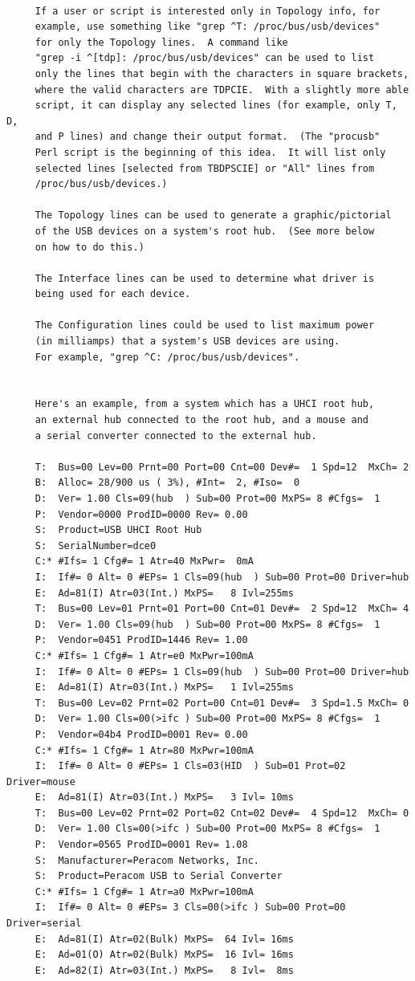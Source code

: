 {{{{{{{{{{{{{{{{{\begin{verbatim}
     
     If a user or script is interested only in Topology info, for
     example, use something like "grep ^T: /proc/bus/usb/devices"
     for only the Topology lines.  A command like
     "grep -i ^[tdp]: /proc/bus/usb/devices" can be used to list
     only the lines that begin with the characters in square brackets,
     where the valid characters are TDPCIE.  With a slightly more able
     script, it can display any selected lines (for example, only T, D,
     and P lines) and change their output format.  (The "procusb"
     Perl script is the beginning of this idea.  It will list only
     selected lines [selected from TBDPSCIE] or "All" lines from
     /proc/bus/usb/devices.)
     
     The Topology lines can be used to generate a graphic/pictorial
     of the USB devices on a system's root hub.  (See more below
     on how to do this.)
     
     The Interface lines can be used to determine what driver is
     being used for each device.
     
     The Configuration lines could be used to list maximum power
     (in milliamps) that a system's USB devices are using.
     For example, "grep ^C: /proc/bus/usb/devices".
     
     
     Here's an example, from a system which has a UHCI root hub,
     an external hub connected to the root hub, and a mouse and
     a serial converter connected to the external hub.
     
     T:  Bus=00 Lev=00 Prnt=00 Port=00 Cnt=00 Dev#=  1 Spd=12  MxCh= 2
     B:  Alloc= 28/900 us ( 3%), #Int=  2, #Iso=  0
     D:  Ver= 1.00 Cls=09(hub  ) Sub=00 Prot=00 MxPS= 8 #Cfgs=  1
     P:  Vendor=0000 ProdID=0000 Rev= 0.00
     S:  Product=USB UHCI Root Hub
     S:  SerialNumber=dce0
     C:* #Ifs= 1 Cfg#= 1 Atr=40 MxPwr=  0mA
     I:  If#= 0 Alt= 0 #EPs= 1 Cls=09(hub  ) Sub=00 Prot=00 Driver=hub
     E:  Ad=81(I) Atr=03(Int.) MxPS=   8 Ivl=255ms
     T:  Bus=00 Lev=01 Prnt=01 Port=00 Cnt=01 Dev#=  2 Spd=12  MxCh= 4
     D:  Ver= 1.00 Cls=09(hub  ) Sub=00 Prot=00 MxPS= 8 #Cfgs=  1
     P:  Vendor=0451 ProdID=1446 Rev= 1.00
     C:* #Ifs= 1 Cfg#= 1 Atr=e0 MxPwr=100mA
     I:  If#= 0 Alt= 0 #EPs= 1 Cls=09(hub  ) Sub=00 Prot=00 Driver=hub
     E:  Ad=81(I) Atr=03(Int.) MxPS=   1 Ivl=255ms
     T:  Bus=00 Lev=02 Prnt=02 Port=00 Cnt=01 Dev#=  3 Spd=1.5 MxCh= 0
     D:  Ver= 1.00 Cls=00(>ifc ) Sub=00 Prot=00 MxPS= 8 #Cfgs=  1
     P:  Vendor=04b4 ProdID=0001 Rev= 0.00
     C:* #Ifs= 1 Cfg#= 1 Atr=80 MxPwr=100mA
     I:  If#= 0 Alt= 0 #EPs= 1 Cls=03(HID  ) Sub=01 Prot=02 Driver=mouse
     E:  Ad=81(I) Atr=03(Int.) MxPS=   3 Ivl= 10ms
     T:  Bus=00 Lev=02 Prnt=02 Port=02 Cnt=02 Dev#=  4 Spd=12  MxCh= 0
     D:  Ver= 1.00 Cls=00(>ifc ) Sub=00 Prot=00 MxPS= 8 #Cfgs=  1
     P:  Vendor=0565 ProdID=0001 Rev= 1.08
     S:  Manufacturer=Peracom Networks, Inc.
     S:  Product=Peracom USB to Serial Converter
     C:* #Ifs= 1 Cfg#= 1 Atr=a0 MxPwr=100mA
     I:  If#= 0 Alt= 0 #EPs= 3 Cls=00(>ifc ) Sub=00 Prot=00 Driver=serial
     E:  Ad=81(I) Atr=02(Bulk) MxPS=  64 Ivl= 16ms
     E:  Ad=01(O) Atr=02(Bulk) MxPS=  16 Ivl= 16ms
     E:  Ad=82(I) Atr=03(Int.) MxPS=   8 Ivl=  8ms
     

\end{verbatim}}}}}}}}}}}}}}}}}}
